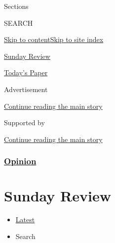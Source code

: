 Sections

SEARCH

\protect\hyperlink{site-content}{Skip to
content}\protect\hyperlink{site-index}{Skip to site index}

\href{https://www.nytimes3xbfgragh.onion/section/opinion/sunday}{Sunday
Review}

\href{https://myaccount.nytimes3xbfgragh.onion/auth/login?response_type=cookie\&client_id=vi}{}

\href{https://www.nytimes3xbfgragh.onion/section/todayspaper}{Today's
Paper}

Advertisement

\protect\hyperlink{after-top}{Continue reading the main story}

Supported by

\protect\hyperlink{after-sponsor}{Continue reading the main story}

\hypertarget{opinion}{%
\subsubsection{\texorpdfstring{\href{/section/opinion}{Opinion}}{Opinion}}\label{opinion}}

\hypertarget{sunday-review}{%
\section{Sunday Review}\label{sunday-review}}

\begin{itemize}
\tightlist
\item
  \protect\hyperlink{stream-panel}{Latest}
\item
  Search
\end{itemize}

